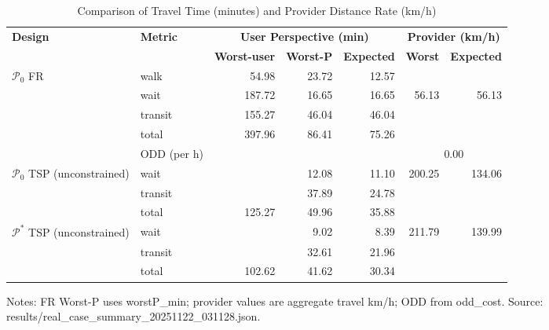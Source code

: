 \begin{table}[t]
\centering
\caption{Comparison of Travel Time (minutes) and Provider Distance Rate (km/h)}
\begin{tabular}{l l r r r r r}
\toprule
\textbf{Design} & \textbf{Metric} & 
\multicolumn{3}{c}{\textbf{User Perspective (min)}} & 
\multicolumn{2}{c}{\textbf{Provider (km/h)}} \\
\cmidrule(lr){3-5}\cmidrule(lr){6-7}
& & \textbf{Worst-user} & \textbf{Worst-P} & \textbf{Expected} & \textbf{Worst} & \textbf{Expected} \\
\midrule
$\mathcal{P}_0$ FR & walk    & 54.98 & 23.72 & 12.57 &        &        \\
                   & wait    & 187.72 & 16.65 & 16.65 & 56.13  & 56.13  \\
                   & transit & 155.27 & 46.04 & 46.04 &        &        \\
                   & total   & 397.96 & 86.41 & 75.26 &       &        \\
                   & ODD (per h) &  &  &  & \multicolumn{2}{c}{0.00} \\
\midrule
$\mathcal{P}_0$ TSP (unconstrained) & wait    &  & 12.08 & 11.10 & 200.25 & 134.06 \\
                                    & transit &  & 37.89 & 24.78 &        &       \\
                                    & total   & 125.27 & 49.96 & 35.88 &        &       \\
\midrule
$\mathcal{P}^*$ TSP (unconstrained) & wait    &  & 9.02 & 8.39 & 211.79 & 139.99 \\
                                    & transit &  & 32.61 & 21.96 &        &       \\
                                    & total   & 102.62 & 41.62 & 30.34 &        &       \\
\bottomrule
\end{tabular}

\vspace{0.5ex}
\small
Notes: FR Worst-P uses worstP\_min; provider values are aggregate travel km/h; ODD from odd\_cost. Source: results/real_case_summary_20251122_031128.json.
\end{table}